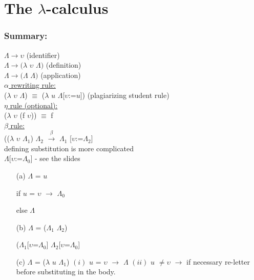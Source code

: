 \documentclass{article}
\begin{document}
\section*{The $\lambda$-calculus}
\subsubsection*{Summary:}
\begin{flushleft}
$\Lambda\rightarrow\upsilon$ (identifier) \\ 
$\Lambda\rightarrow(\lambda$ $\upsilon$ $\Lambda)$ (definition) \\
$\Lambda\rightarrow(\Lambda$ $\Lambda)$ (application) \\
\bigskip
\underline{$\alpha$ rewriting rule:}\\
($\lambda$ $\upsilon$ $\Lambda$) $\equiv$ ($\lambda$ $\mathit{u}$ $\Lambda$[$\upsilon$:=$\mathit{u}$]) (plagiarizing student rule)\\
\bigskip
\underline{$\eta$ rule (optional):}\\
($\lambda$ $\upsilon$ (f $\upsilon$)) $\equiv$ f\\
\bigskip
\underline{$\beta$ rule:}\\
(($\lambda$ $\upsilon$ ${\Lambda}_{1}$) ${\Lambda}_{2}$ $\xrightarrow{\beta}$ ${\Lambda}_{1}$ [$\upsilon$:=${\Lambda}_{2}$]\\
\bigskip
defining substitution is more complicated\\
$\Lambda$[$\upsilon$:=${\Lambda}_{0}$] - see the slides \\
\begin{itemize}
 \item[(a)] $\Lambda$ = $\mathit{u}$
 \item[] if $\mathit{u}$ = $\upsilon$ $\rightarrow$ ${\Lambda}_{0}$ 
 \item[] else $\Lambda$
 \item[(b)] $\Lambda$ = (${\Lambda}_{1}$ ${\Lambda}_{2}$)
 \item[] (${\Lambda}_{1}$[$\upsilon$=${\Lambda}_{0}$] ${\Lambda}_{2}$[$\upsilon$=${\Lambda}_{0}$]
 \item[(c)] $\Lambda$ = ($\lambda$ $\mathit{u}$ ${\Lambda}_{1}$)
 \subitem$\mathit{(i)}$ $\mathit{u}$ = $\upsilon$ $\rightarrow$ $\Lambda$
 \subitem$\mathit{(ii)}$ $\mathit{u}$ $\neq\upsilon$ $\rightarrow$ if necessary re-letter before substituting in the body.
\end{itemize}
\end{flushleft}
\pagebreak
\end{document}
